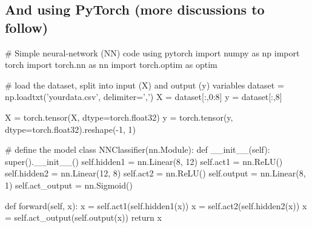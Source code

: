 \documentclass[%
oneside,                 %
final,                   %
10pt]{article}
\begin{document}
\epycod


\subsection{And using PyTorch (more discussions to follow)}






























































\bpycod
# Simple neural-network (NN) code using pytorch
import numpy as np
import torch
import torch.nn as nn
import torch.optim as optim
 
# load the dataset, split into input (X) and output (y) variables
dataset = np.loadtxt('yourdata.csv', delimiter=',')
X = dataset[:,0:8]
y = dataset[:,8]
 
X = torch.tensor(X, dtype=torch.float32)
y = torch.tensor(y, dtype=torch.float32).reshape(-1, 1)

# define the model
class NNClassifier(nn.Module):
    def __init__(self):
        super().__init__()
        self.hidden1 = nn.Linear(8, 12)
        self.act1 = nn.ReLU()
        self.hidden2 = nn.Linear(12, 8)
        self.act2 = nn.ReLU()
        self.output = nn.Linear(8, 1)
        self.act_output = nn.Sigmoid()
 
    def forward(self, x):
        x = self.act1(self.hidden1(x))
        x = self.act2(self.hidden2(x))
        x = self.act_output(self.output(x))
        return x
 
\end{document}
